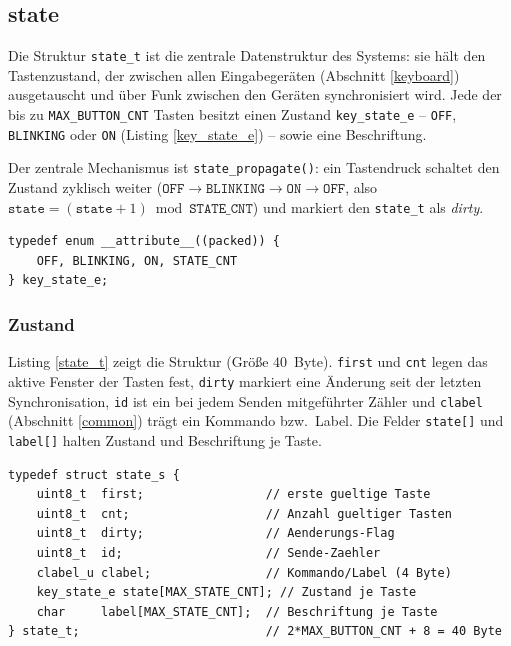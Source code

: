 \subsection{state}\label{state}
Die Struktur \verb|state_t| ist die zentrale Datenstruktur des Systems: sie
hält den Tastenzustand, der zwischen allen Eingabegeräten (Abschnitt
\ref{keyboard}) ausgetauscht und über Funk zwischen den Geräten
synchronisiert wird. Jede der bis zu \verb|MAX_BUTTON_CNT| Tasten besitzt
einen Zustand \verb|key_state_e| -- \verb|OFF|, \verb|BLINKING| oder
\verb|ON| (Listing \ref{key_state_e}) -- sowie eine Beschriftung.

Der zentrale Mechanismus ist \verb|state_propagate()|: ein Tastendruck
schaltet den Zustand zyklisch weiter
($\mathtt{OFF} \to \mathtt{BLINKING} \to \mathtt{ON} \to \mathtt{OFF}$,
also $\mathtt{state} = (\mathtt{state}+1) \bmod \mathtt{STATE\_CNT}$) und
markiert den \verb|state_t| als \emph{dirty}.

\begin{listing}
\begin{verbatim}
typedef enum __attribute__((packed)) {
    OFF, BLINKING, ON, STATE_CNT
} key_state_e;
\end{verbatim}
\caption{Tastenzustand \texttt{key\_state\_e}}
\label{key_state_e}
\end{listing}

\subsubsection*{Zustand}
Listing \ref{state_t} zeigt die Struktur (Größe $40$~Byte). \verb|first| und
\verb|cnt| legen das aktive Fenster der Tasten fest, \verb|dirty| markiert
eine Änderung seit der letzten Synchronisation, \verb|id| ist ein bei jedem
Senden mitgeführter Zähler und \verb|clabel| (Abschnitt \ref{common}) trägt
ein Kommando bzw.\ Label. Die Felder \verb|state[]| und \verb|label[]| halten
Zustand und Beschriftung je Taste.

\begin{listing}
\begin{verbatim}
typedef struct state_s {
    uint8_t  first;                 // erste gueltige Taste
    uint8_t  cnt;                   // Anzahl gueltiger Tasten
    uint8_t  dirty;                 // Aenderungs-Flag
    uint8_t  id;                    // Sende-Zaehler
    clabel_u clabel;                // Kommando/Label (4 Byte)
    key_state_e state[MAX_STATE_CNT]; // Zustand je Taste
    char     label[MAX_STATE_CNT];  // Beschriftung je Taste
} state_t;                          // 2*MAX_BUTTON_CNT + 8 = 40 Byte
\end{verbatim}
\caption{Definition der \texttt{state\_t} Struktur}
\label{state_t}
\end{listing}

